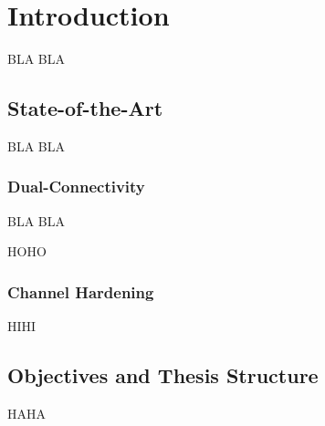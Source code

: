 \chapter{Introduction} \label{chp:introduction}

BLA BLA

\section{State-of-the-Art}
BLA BLA
\subsection{Dual-Connectivity}\label{sec:chp_intr_multi_connect}
BLA BLA

HOHO
\subsection{Channel Hardening}\label{sec:chp_intr_channel_hardening}
HIHI

\section{Objectives and Thesis Structure}
HAHA

